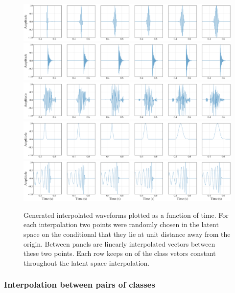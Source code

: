 \documentclass[12pt]{iopart}
\begin{document}
\begin{figure}
    \centering
    \includegraphics[width=\textwidth]{figures/generations/z_interp_sg.png}
    \includegraphics[width=\textwidth]{figures/generations/z_interp_rd.png}
    \includegraphics[width=\textwidth]{figures/generations/z_interp_wnb.png}
    \includegraphics[width=\textwidth]{figures/generations/z_interp_blip.png}
    \includegraphics[width=\textwidth]{figures/generations/z_interp_bbh.png}
    \caption{Generated interpolated waveforms plotted as a function of time. For each interpolation two points were randomly chosen in the latent space on the conditional that they lie at unit distance away from the origin. Between panels are linearly interpolated vectors between these two points. Each row keeps on of the class vetors constant throughout the latent space interpolation.}
    \label{fig:z_interp}
\end{figure}

\subsubsection{Interpolation between pairs of classes}
\end{document}
